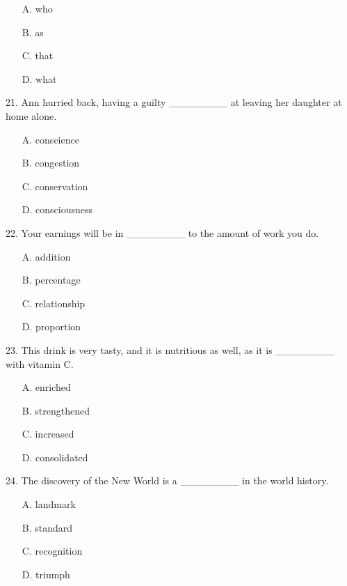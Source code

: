 \documentclass[UTF8,11pt]{ctexart}
\begin{document}
\begin{itemize}[leftmargin=2em,itemsep=.2em,topsep=.4em]\item[A.] who
\item[B.] as
\item[C.] that
\item[D.] what
\end{itemize}

21. Ann hurried back, having a guilty \_\_\_\_\_\_\_\_ at leaving her daughter at home alone.


\begin{itemize}[leftmargin=2em,itemsep=.2em,topsep=.4em]\item[A.] conscience
\item[B.] congestion
\item[C.] conservation
\item[D.] consciousness
\end{itemize}

22. Your earnings will be in \_\_\_\_\_\_\_\_ to the amount of work you do.


\begin{itemize}[leftmargin=2em,itemsep=.2em,topsep=.4em]\item[A.] addition
\item[B.] percentage
\item[C.] relationship
\item[D.] proportion
\end{itemize}

23. This drink is very tasty, and it is nutritious as well, as it is \_\_\_\_\_\_\_\_ with vitamin C.


\begin{itemize}[leftmargin=2em,itemsep=.2em,topsep=.4em]\item[A.] enriched
\item[B.] strengthened
\item[C.] increased
\item[D.] consolidated
\end{itemize}

24. The discovery of the New World is a \_\_\_\_\_\_\_\_ in the world history.


\begin{itemize}[leftmargin=2em,itemsep=.2em,topsep=.4em]\item[A.] landmark
\item[B.] standard
\item[C.] recognition
\item[D.] triumph
\end{itemize}
\end{document}
